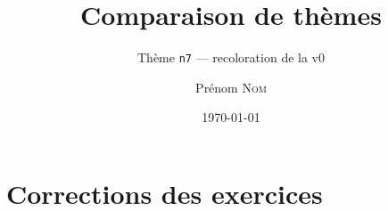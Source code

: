 \documentclass[11pt]{ocots-book}
\title{Comparaison de thèmes}
\subtitle{Thème \texttt{n7} — recoloration de la v0}
\author{Prénom \textsc{Nom}}
\date{\today}
\begin{document}
\maketitle

\ocotscollectsolutions%





\chapter{Corrections des exercices}
\ocotsprintsolutions%



\end{document}

